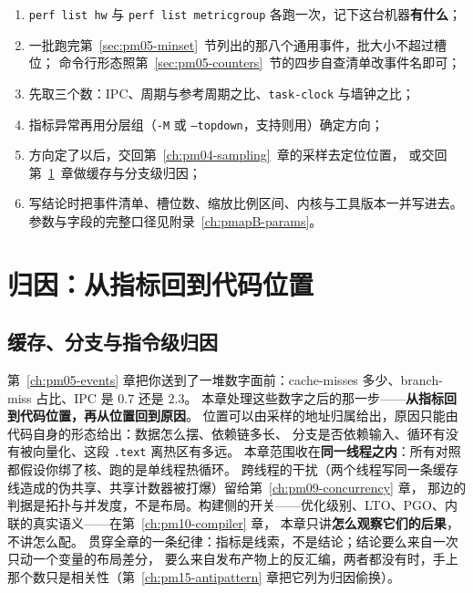 \documentclass[12pt,a4paper,fontset=fandol]{ctexbook}
\newcommand{\Tp}[1]{\texttt{#1}}
\newcommand{\Bk}{\discretionary{}{}{}}
\newcommand{\Mx}[1]{\textsf{#1}}
\begin{document}
\begin{guideline}[title={本章的最小起手式}]
\begin{enumerate}
  \item \Tp{perf list hw} 与 \Tp{perf list metricgroup} 各跑一次，记下这台机器\textbf{有什么}；
  \item 一批跑完第~\ref{sec:pm05-minset}~节列出的那八个通用事件，批大小不超过槽位；
        命令行形态照第~\ref{sec:pm05-counters}~节的四步自查清单改事件名即可；
  \item 先取三个数：\Mx{IPC}、周期与参考周期之比、\Tp{task{\Bk}-clock} 与墙钟之比；
  \item 指标异常再用分层组（\Tp{-M} 或 \Tp{--topdown}，支持则用）确定方向；
  \item 方向定了以后，交回第~\ref{ch:pm04-sampling}~章的采样去定位位置，
        或交回第~\ref{ch:pm06-micro}~章做缓存与分支级归因；
  \item 写结论时把事件清单、槽位数、缩放比例区间、内核与工具版本一并写进去。
        参数与字段的完整口径见附录~\ref{ch:pmapB-params}。
\end{enumerate}
\end{guideline}
\part{归因：从指标回到代码位置}

\chapter{缓存、分支与指令级归因}
\label{ch:pm06-micro}

第~\ref{ch:pm05-events} 章把你送到了一堆数字面前：\Mx{cache{\Bk}-misses} 多少、\Mx{branch{\Bk}-miss} 占比、\Mx{IPC} 是 $0.7$ 还是 $2.3$。
本章处理这些数字之后的那一步——\textbf{从指标回到代码位置，再从位置回到原因}。
位置可以由采样的地址归属给出，原因只能由代码自身的形态给出：数据怎么摆、依赖链多长、
分支是否依赖输入、循环有没有被向量化、这段 \Tp{.text} 离热区有多远。
本章范围收在\textbf{同一线程之内}：所有对照都假设你绑了核、跑的是单线程热循环。
跨线程的干扰（两个线程写同一条缓存线造成的伪共享、共享计数器被打爆）留给第~\ref{ch:pm09-concurrency} 章，
那边的判据是拓扑与并发度，不是布局。构建侧的开关——优化级别、LTO、PGO、内联的真实语义——在第~\ref{ch:pm10-compiler} 章，
本章只讲\textbf{怎么观察它们的后果}，不讲怎么配。
贯穿全章的一条纪律：指标是线索，不是结论；结论要么来自一次只动一个变量的布局差分，
要么来自发布产物上的反汇编，两者都没有时，手上那个数只是相关性（第~\ref{ch:pm15-antipattern} 章把它列为归因偷换）。
\end{document}
